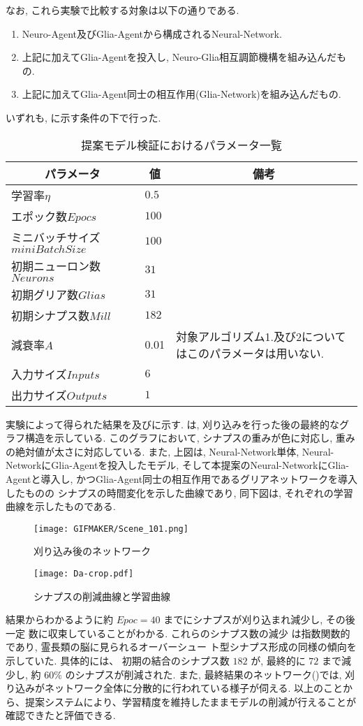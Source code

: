 なお, これら実験で比較する対象は以下の通りである.
\begin{enumerate}[対象アルゴリズム1. ]
  \item Neuro-Agent及びGlia-Agentから構成されるNeural-Network.
  \item 上記に加えてGlia-Agentを投入し, Neuro-Glia相互調節機構を組み込んだもの.
  \item 上記に加えてGlia-Agent同士の相互作用(Glia-Network)を組み込んだもの.
\end{enumerate}
いずれも, に示す条件の下で行った. 
\begin{table}[H]
  \caption{提案モデル検証におけるパラメータ一覧}
  \label{tab:Pram}
  \centering
   \begin{tabular}{lll}
    \toprule
    \multicolumn{1}{c}{パラメータ}&\multicolumn{1}{c}{値}&\multicolumn{1}{c}{備考}\\\midrule\midrule
      学習率$\eta$&$0.5$&\\
      エポック数$Epocs$&$100$&\\
      ミニバッチサイズ$miniBatchSize$&$100$&\\
      初期ニューロン数$Neurons$&$31$&\\
      初期グリア数$Glias$&$31$&\\
      初期シナプス数$Mill$&$182$&\\
      減衰率$A$&0.01&対象アルゴリズム1.及び2についてはこのパラメータは用いない.\\
      入力サイズ$Inputs$&$6$&\\
      出力サイズ$Outputs$&$1$&\\
    \bottomrule
   \end{tabular}
 \end{table}
 実験によって得られた結果を及びに示す.
 は, 刈り込みを行った後の最終的なグラフ構造を示している.
 このグラフにおいて, シナプスの重みが色に対応し, 重みの絶対値が太さに対応している.
 また, 上図は, Neural-Network単体, Neural-NetworkにGlia-Agentを投入したモデル,
そして本提案のNeural-NetworkにGlia-Agentと導入し, かつGlia-Agent同士の相互作用であるグリアネットワークを導入したものの
シナプスの時間変化を示した曲線であり, 同下図は, それぞれの学習曲線を示したものである.
\begin{figure}[H]
  \centering
  \texttt{[image: GIFMAKER/Scene\_101.png]}  
  \caption{刈り込み後のネットワーク}
  \label{fig:CalcGraph}
 \end{figure}
\begin{figure}[H]
  \centering
  \texttt{[image: Da-crop.pdf]}
  \caption{シナプスの削減曲線と学習曲線}
  \label{fig:Curve}
\end{figure}
結果からわかるように約 $Epoc = 40$ までにシナプスが刈り込まれ減少し, その後一定 数に収束していることがわかる. これらのシナプス数の減少 は指数関数的であり, 霊長類の脳に見られるオーバーシュー ト型シナプス形成の同様の傾向を示していた. 具体的には、 初期の結合のシナプス数 $182$ が, 最終的に $72$ まで減少し, 約 $60\%$ のシナプスが削減された.
また, 最終結果のネットワーク()では, 
刈り込みがネットワーク全体に分散的に行われている様子が伺える. 以上のことから、提案システムにより、学習精度を維持したままモデルの削減が行えることが確認できたと評価できる.
